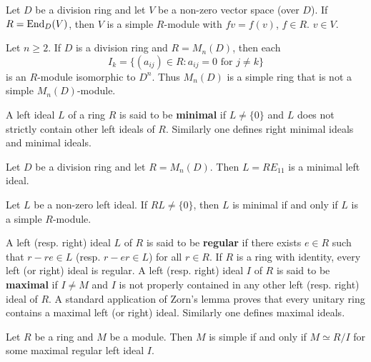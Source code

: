 \begin{example}
	Let $D$ be a division ring and let $V$ be a non-zero vector space (over $D$). If 
	$R=\operatorname{End}_D(V)$, then $V$ is a simple $R$-module with $fv=f(v)$, $f\in R$.
	$v\in V$. 
\end{example}

\begin{example}
	\label{exa:I_k}
	Let $n\geq2$.  If $D$ is a division ring and $R=M_n(D)$, then each 
	\[
	I_k=\{ (a_{ij})\in R:a_{ij}=0\text{ for $j\ne k$}\}
	\]
	is an $R$-module isomorphic to $D^n$. 
	Thus $M_{n}(D)$ is a simple ring that is not a simple $M_n(D)$-module.
\end{example}

A left ideal $L$ of a ring $R$ is said to be \textbf{minimal} if $L\ne\{0\}$ and 
$L$ does not strictly contain other left ideals of $R$. Similarly one defines
right minimal ideals and minimal ideals. 

\begin{example}
	Let $D$ be a division ring and let $R=M_n(D)$. Then $L=RE_{11}$ 
	is a minimal left ideal.
\end{example}

\begin{example}
	Let $L$ be a non-zero left ideal. If $RL\ne\{0\}$, then
	$L$ is minimal if and only if $L$ is a simple $R$-module. 
\end{example}

A left (resp. right) ideal $L$ of $R$ is said to be \textbf{regular} if
there exists $e\in R$ such that $r-re\in L$ (resp.  $r-er\in L$) for all $r\in R$. 
If $R$ is a ring with identity, every left (or right) ideal is regular. 
A left (resp. right) ideal $I$ of $R$ is said to be \textbf{maximal} if $I\ne M$ and $I$ is not properly contained 
in any other left (resp. right) ideal of $R$. 
A standard
application of Zorn's lemma proves that every unitary ring contains a maximal left (or right) ideal.  
Similarly one defines maximal ideals. 


\begin{proposition}
	\label{proposition:R/I}
	Let $R$ be a ring and $M$ be a module. Then $M$ is simple if and only if
	$M\simeq R/I$ for some maximal regular left ideal $I$. 	
\end{proposition}

